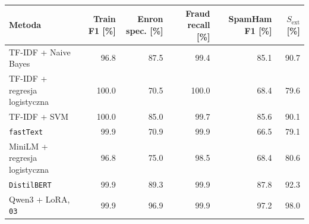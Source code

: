 \begin{tabular}{lrrrrr}
\hline
\textbf{Metoda} & \textbf{Train F1 [\%]} & \textbf{Enron spec. [\%]} & \textbf{Fraud recall [\%]} & \textbf{SpamHam F1 [\%]} & \textbf{\(S_{\mathrm{ext}}\) [\%]} \\
\hline
TF-IDF + Naive Bayes & 96.8 & 87.5 & 99.4 & 85.1 & 90.7 \\
TF-IDF + regresja logistyczna & 100.0 & 70.5 & 100.0 & 68.4 & 79.6 \\
TF-IDF + SVM & 100.0 & 85.0 & 99.7 & 85.6 & 90.1 \\
\texttt{fastText} & 99.9 & 70.9 & 99.9 & 66.5 & 79.1 \\
MiniLM + regresja logistyczna & 96.8 & 75.0 & 98.5 & 68.4 & 80.6 \\
\texttt{DistilBERT} & 99.9 & 89.3 & 99.9 & 87.8 & 92.3 \\
Qwen3 + LoRA, \texttt{03} & 99.9 & 96.9 & 99.9 & 97.2 & 98.0 \\
\hline
\end{tabular}
